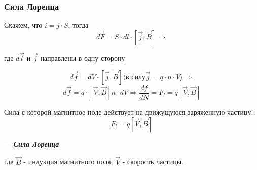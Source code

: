 \documentclass[../main.tex]{subfiles}
\begin{document}
\subsubsection{Сила Лоренца}

Скажем, что $i = j \cdot S$, тогда
\[d \vec F = S \cdot dl \cdot [\vec j, \vec B] \Rightarrow\]
\begin{center}
    где $d \vec l$ и $ \vec j$ направлены в одну сторону
\end{center}
\[d \vec f = dV \cdot [\vec j, \vec B] \langle \text{в силу} \vec j = q \cdot n \cdot V \rangle \Rightarrow \]
\[d \vec f = q \cdot [\vec V, \vec B] n \cdot dV \Rightarrow \frac{df}{dN} = F_l = q[\vec V, \vec B]\]

Сила с которой магнитное поле действует на движущуюся заряженную частицу:
\[F_l = q[\vec V, \vec B]\]
\begin{center}
    --- \textit{\textbf{Сила Лоренца}}
\end{center}

где $\vec B$ - индукция магнитного поля, $\vec V$ - скорость частицы.
\end{document}
